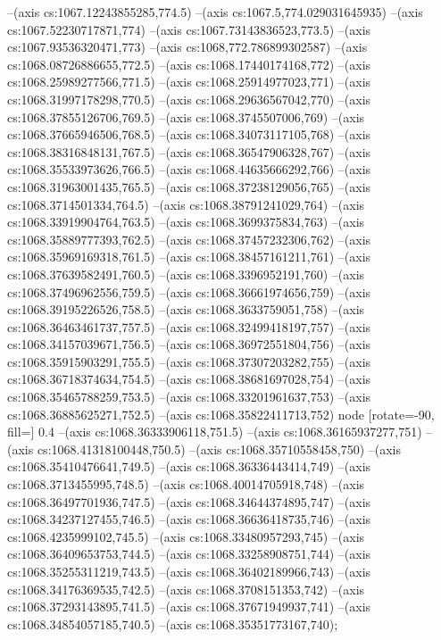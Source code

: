 --(axis cs:1067.12243855285,774.5)
--(axis cs:1067.5,774.029031645935)
--(axis cs:1067.52230717871,774)
--(axis cs:1067.73143836523,773.5)
--(axis cs:1067.93536320471,773)
--(axis cs:1068,772.786899302587)
--(axis cs:1068.08726886655,772.5)
--(axis cs:1068.17440174168,772)
--(axis cs:1068.25989277566,771.5)
--(axis cs:1068.25914977023,771)
--(axis cs:1068.31997178298,770.5)
--(axis cs:1068.29636567042,770)
--(axis cs:1068.37855126706,769.5)
--(axis cs:1068.3745507006,769)
--(axis cs:1068.37665946506,768.5)
--(axis cs:1068.34073117105,768)
--(axis cs:1068.38316848131,767.5)
--(axis cs:1068.36547906328,767)
--(axis cs:1068.35533973626,766.5)
--(axis cs:1068.44635666292,766)
--(axis cs:1068.31963001435,765.5)
--(axis cs:1068.37238129056,765)
--(axis cs:1068.3714501334,764.5)
--(axis cs:1068.38791241029,764)
--(axis cs:1068.33919904764,763.5)
--(axis cs:1068.3699375834,763)
--(axis cs:1068.35889777393,762.5)
--(axis cs:1068.37457232306,762)
--(axis cs:1068.35969169318,761.5)
--(axis cs:1068.38457161211,761)
--(axis cs:1068.37639582491,760.5)
--(axis cs:1068.3396952191,760)
--(axis cs:1068.37496962556,759.5)
--(axis cs:1068.36661974656,759)
--(axis cs:1068.39195226526,758.5)
--(axis cs:1068.3633759051,758)
--(axis cs:1068.36463461737,757.5)
--(axis cs:1068.32499418197,757)
--(axis cs:1068.34157039671,756.5)
--(axis cs:1068.36972551804,756)
--(axis cs:1068.35915903291,755.5)
--(axis cs:1068.37307203282,755)
--(axis cs:1068.36718374634,754.5)
--(axis cs:1068.38681697028,754)
--(axis cs:1068.35465788259,753.5)
--(axis cs:1068.33201961637,753)
--(axis cs:1068.36885625271,752.5)
--(axis cs:1068.35822411713,752) node [rotate=-90, fill=\bgcol] {0.4}
--(axis cs:1068.36333906118,751.5)
--(axis cs:1068.36165937277,751)
--(axis cs:1068.41318100448,750.5)
--(axis cs:1068.35710558458,750)
--(axis cs:1068.35410476641,749.5)
--(axis cs:1068.36336443414,749)
--(axis cs:1068.3713455995,748.5)
--(axis cs:1068.40014705918,748)
--(axis cs:1068.36497701936,747.5)
--(axis cs:1068.34644374895,747)
--(axis cs:1068.34237127455,746.5)
--(axis cs:1068.36636418735,746)
--(axis cs:1068.4235999102,745.5)
--(axis cs:1068.33480957293,745)
--(axis cs:1068.36409653753,744.5)
--(axis cs:1068.33258908751,744)
--(axis cs:1068.35255311219,743.5)
--(axis cs:1068.36402189966,743)
--(axis cs:1068.34176369535,742.5)
--(axis cs:1068.3708151353,742)
--(axis cs:1068.37293143895,741.5)
--(axis cs:1068.37671949937,741)
--(axis cs:1068.34854057185,740.5)
--(axis cs:1068.35351773167,740);

